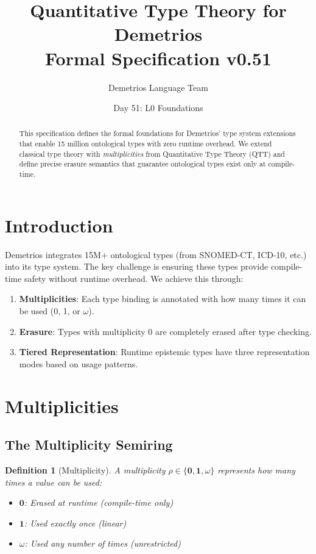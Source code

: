\documentclass[11pt]{article}
\title{Quantitative Type Theory for Demetrios\\
\large Formal Specification v0.51}
\author{Demetrios Language Team}
\date{Day 51: L0 Foundations}
\newtheorem{definition}{Definition}
\newcommand{\mult}{\rho}
\newcommand{\zero}{\mathbf{0}}
\newcommand{\one}{\mathbf{1}}
\newcommand{\many}{\omega}
\begin{document}
\maketitle

\begin{abstract}
This specification defines the formal foundations for Demetrios' type system
extensions that enable 15 million ontological types with zero runtime overhead.
We extend classical type theory with \emph{multiplicities} from Quantitative
Type Theory (QTT) and define precise erasure semantics that guarantee
ontological types exist only at compile-time.
\end{abstract}

\section{Introduction}

Demetrios integrates 15M+ ontological types (from SNOMED-CT, ICD-10, etc.)
into its type system. The key challenge is ensuring these types provide
compile-time safety without runtime overhead. We achieve this through:

\begin{enumerate}
\item \textbf{Multiplicities}: Each type binding is annotated with how many
      times it can be used (0, 1, or $\omega$).
\item \textbf{Erasure}: Types with multiplicity 0 are completely erased
      after type checking.
\item \textbf{Tiered Representation}: Runtime epistemic types have three
      representation modes based on usage patterns.
\end{enumerate}

\section{Multiplicities}

\subsection{The Multiplicity Semiring}

\begin{definition}[Multiplicity]
A multiplicity $\mult \in \{\zero, \one, \many\}$ represents how many times
a value can be used:
\begin{itemize}
\item $\zero$: Erased at runtime (compile-time only)
\item $\one$: Used exactly once (linear)
\item $\many$: Used any number of times (unrestricted)
\end{itemize}
\end{definition}
\end{document}
